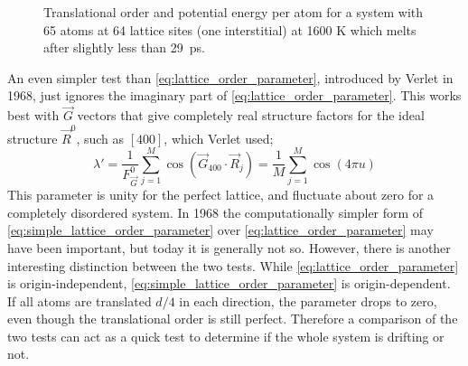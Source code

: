 \documentclass[11pt,bibliography=totoc,index=totoc]{scrbook}   %
\begin{document}


\begin{figure}[htbp]
  \centering
  \caption{Translational order and potential energy per atom for a system with 65 atoms at 64 lattice sites (one interstitial) at 1600 K which
  melts after slightly less than 29~ps.}
  \label{fig:melting1600}
\end{figure}

An even simpler test than \eqref{eq:lattice_order_parameter}, introduced by Verlet in 1968, just ignores the imaginary part of \eqref{eq:lattice_order_parameter}.\cite{Verlet:1968a}\cite[117]{Haile:1992} 
This works best with $\vec{G}$ vectors that give completely real structure factors for the ideal structure $\vec{R}^0$, such as $[400]$, which Verlet used;
\begin{equation}
    \lambda' = \frac{1}{F_{\vec{G}}^0} \sum_{j=1}^M \cos\left( \vec{G}_{400}\cdot\vec{R}_j \right) = \frac{1}{M}\sum_{j=1}^M \cos\left(4\pi u\right)
  \label{eq:simple_lattice_order_parameter}
\end{equation}
This parameter is unity for the perfect lattice, and fluctuate about zero for a completely disordered system.
In 1968 the computationally simpler form of \eqref{eq:simple_lattice_order_parameter} over \eqref{eq:lattice_order_parameter} may have been important, but today it is generally not so. 
However, there is another interesting distinction between the two tests. While \eqref{eq:lattice_order_parameter} is origin-independent, \eqref{eq:simple_lattice_order_parameter} is origin-dependent.
If all atoms are translated $d/4$ in each direction, the parameter drops to zero, even though the translational order is still perfect.
Therefore a comparison of the two tests can act as a quick test to determine if the whole system is drifting or not.
\end{document}
